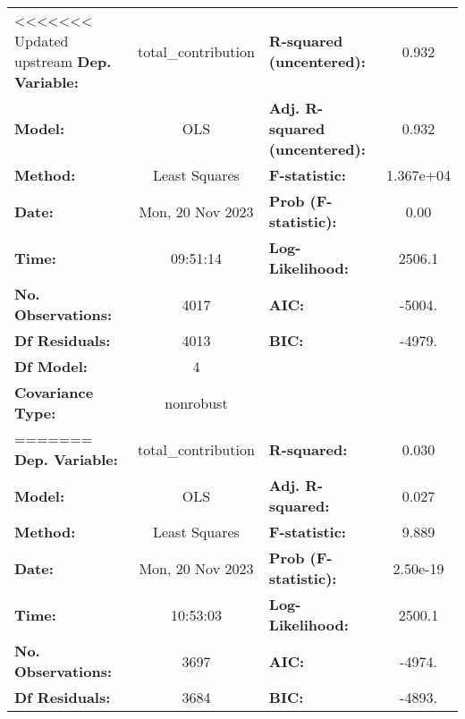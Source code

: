 \begin{center}
\begin{tabular}{lclc}
\toprule
<<<<<<< Updated upstream
\textbf{Dep. Variable:}                & total\_contribution & \textbf{  R-squared (uncentered):}      &     0.932   \\
\textbf{Model:}                        &         OLS         & \textbf{  Adj. R-squared (uncentered):} &     0.932   \\
\textbf{Method:}                       &    Least Squares    & \textbf{  F-statistic:       }          & 1.367e+04   \\
\textbf{Date:}                         &   Mon, 20 Nov 2023  & \textbf{  Prob (F-statistic):}          &     0.00    \\
\textbf{Time:}                         &       09:51:14      & \textbf{  Log-Likelihood:    }          &    2506.1   \\
\textbf{No. Observations:}             &          4017       & \textbf{  AIC:               }          &    -5004.   \\
\textbf{Df Residuals:}                 &          4013       & \textbf{  BIC:               }          &    -4979.   \\
\textbf{Df Model:}                     &             4       & \textbf{                     }          &             \\
\textbf{Covariance Type:}              &      nonrobust      & \textbf{                     }          &             \\
=======
\textbf{Dep. Variable:}                      & total\_contribution & \textbf{  R-squared:         } &     0.030   \\
\textbf{Model:}                              &         OLS         & \textbf{  Adj. R-squared:    } &     0.027   \\
\textbf{Method:}                             &    Least Squares    & \textbf{  F-statistic:       } &     9.889   \\
\textbf{Date:}                               &   Mon, 20 Nov 2023  & \textbf{  Prob (F-statistic):} &  2.50e-19   \\
\textbf{Time:}                               &       10:53:03      & \textbf{  Log-Likelihood:    } &    2500.1   \\
\textbf{No. Observations:}                   &          3697       & \textbf{  AIC:               } &    -4974.   \\
\textbf{Df Residuals:}                       &          3684       & \textbf{  BIC:               } &    -4893.   \\

\end{tabular}
\end{center}
